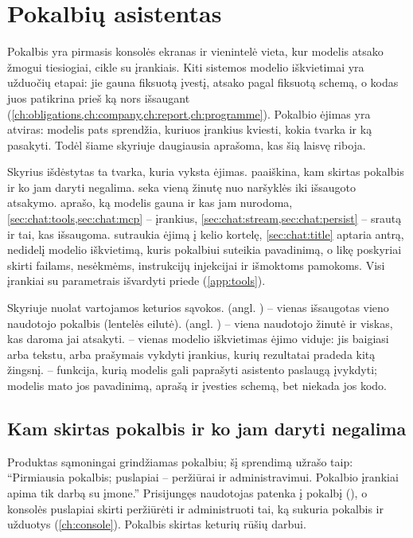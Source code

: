 \chapter{Pokalbių asistentas}\label{ch:chat}

Pokalbis yra pirmasis konsolės ekranas ir vienintelė vieta, kur modelis atsako žmogui
tiesiogiai, cikle su įrankiais. Kiti sistemos modelio iškvietimai yra užduočių etapai: jie gauna
fiksuotą įvestį, atsako pagal fiksuotą schemą, o kodas juos patikrina prieš ką nors išsaugant
(\cref{ch:obligations,ch:company,ch:report,ch:programme}). Pokalbio ėjimas yra atviras: modelis
pats sprendžia, kuriuos įrankius kviesti, kokia tvarka ir ką pasakyti. Todėl šiame skyriuje
daugiausia aprašoma, kas šią laisvę riboja.

Skyrius išdėstytas ta tvarka, kuria vyksta ėjimas.  paaiškina, kam skirtas
pokalbis ir ko jam daryti negalima.  seka vieną žinutę nuo naršyklės iki
išsaugoto atsakymo.  aprašo, ką modelis gauna ir kas jam
nurodoma, \cref{sec:chat:tools,sec:chat:mcp} -- įrankius, \cref{sec:chat:stream,sec:chat:persist}
-- srautą ir tai, kas išsaugoma.  sutraukia ėjimą į kelio kortelę,
\cref{sec:chat:title} aptaria antrą, nedidelį modelio iškvietimą, kuris pokalbiui suteikia
pavadinimą, o likę poskyriai skirti failams, nesėkmėms, instrukcijų injekcijai ir išmoktoms
pamokoms. Visi įrankiai su parametrais išvardyti priede (\cref{app:tools}).

Skyriuje nuolat vartojamos keturios sąvokos.  (angl. ) -- vienas
išsaugotas vieno naudotojo pokalbis (lentelės  eilutė).  (angl.
) -- viena naudotojo žinutė ir viskas, kas daroma jai atsakyti.  -- vienas
modelio iškvietimas ėjimo viduje: jis baigiasi arba tekstu, arba prašymais vykdyti įrankius, kurių
rezultatai pradeda kitą žingsnį.  -- funkcija, kurią modelis gali paprašyti asistento
paslaugą įvykdyti; modelis mato jos pavadinimą, aprašą ir įvesties schemą, bet niekada jos kodo.


\section{Kam skirtas pokalbis ir ko jam daryti negalima}\label{sec:chat:purpose}

Produktas sąmoningai grindžiamas pokalbiu;  šį sprendimą užrašo taip:
\enquote{Pirmiausia pokalbis; puslapiai -- peržiūrai ir administravimui. Pokalbio įrankiai apima
tik darbą su įmone.} Prisijungęs naudotojas patenka į pokalbį (), o konsolės
puslapiai skirti peržiūrėti ir administruoti tai, ką sukuria pokalbis ir užduotys
(\cref{ch:console}). Pokalbis skirtas keturių rūšių darbui.


